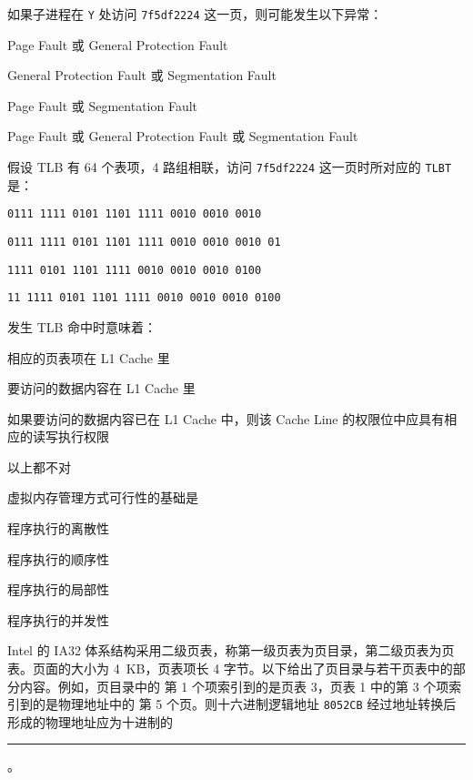 \begin{problems}
\begin{choices}
            \end{choices}
            \subqn 如果子进程在 \verb|Y| 处访问 \verb|7f5df2224| 这一页，则可能发生以下异常：
            \begin{choices}
                \item Page Fault 或 General Protection Fault
                \item General Protection Fault 或 Segmentation Fault
                \item Page Fault 或 Segmentation Fault
                \item Page Fault 或 General Protection Fault 或 Segmentation Fault
            \end{choices}
            \subqn 假设 TLB 有 64 个表项，4 路组相联，访问 \verb|7f5df2224| 这一页时所对应的 \verb|TLBT| 是：
            \begin{choices}
                \item \verb|0111 1111 0101 1101 1111 0010 0010 0010|
                \item \verb|0111 1111 0101 1101 1111 0010 0010 0010 01|
                \item \verb|1111 0101 1101 1111 0010 0010 0010 0100|
                \item \verb|11 1111 0101 1101 1111 0010 0010 0010 0100|
            \end{choices}
            \subqn 发生 TLB 命中时意味着：
            \begin{choices}
                \item 相应的页表项在 L1 Cache 里
                \item 要访问的数据内容在 L1 Cache 里
                \item 如果要访问的数据内容已在 L1 Cache 中，则该 Cache Line 的权限位中应具有相应的读写执行权限
                \item 以上都不对
            \end{choices}
         虚拟内存管理方式可行性的基础是
        \begin{choices}
            \item 程序执行的离散性
            \item 程序执行的顺序性
            \item 程序执行的局部性
            \item 程序执行的并发性
        \end{choices}
         Intel 的 IA32 体系结构采用二级页表，称第一级页表为页目录，第二级页表为页表。页面的大小为 \SI{4}{KB}，页表项长 4 字节。以下给出了页目录与若干页表中的部分内容。例如，页目录中的 第 1 个项索引到的是页表 3，页表 1 中的第 3 个项索引到的是物理地址中的 第 5 个页。则十六进制逻辑地址 \verb|8052CB| 经过地址转换后形成的物理地址应为十进制的 \rule{2.5cm}{0.25mm}。

\end{problems}
